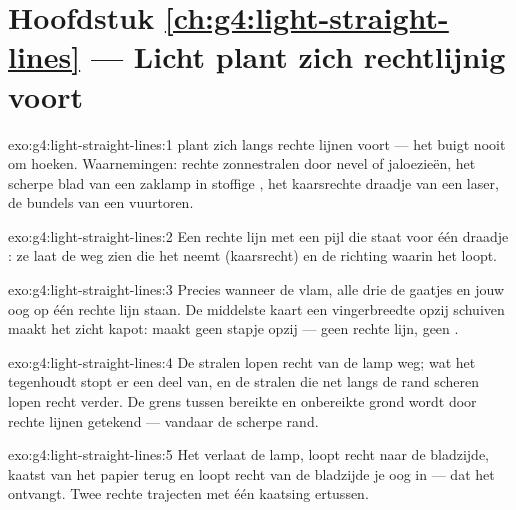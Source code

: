 \section*{Hoofdstuk \ref{ch:g4:light-straight-lines} --- Licht plant zich rechtlijnig voort}

\begin{solution}{exo:g4:light-straight-lines:1}
 plant zich langs rechte lijnen voort --- het buigt nooit om
hoeken. Waarnemingen: rechte zonnestralen door nevel of jaloezieën,
het scherpe blad van een zaklamp in stoffige , het kaarsrechte
draadje van een laser, de bundels van een vuurtoren.
\end{solution}

\begin{solution}{exo:g4:light-straight-lines:2}
Een rechte lijn met een pijl die staat voor één draadje : ze
laat de weg zien die het  neemt (kaarsrecht) en de richting waarin
het loopt.
\end{solution}

\begin{solution}{exo:g4:light-straight-lines:3}
Precies wanneer de vlam, alle drie de gaatjes en jouw oog op één
rechte lijn staan. De middelste kaart een vingerbreedte opzij schuiven
maakt het zicht kapot:  maakt geen stapje opzij --- geen rechte
lijn, geen .
\end{solution}

\begin{solution}{exo:g4:light-straight-lines:4}
De stralen lopen recht van de lamp weg; wat het  tegenhoudt stopt
er een deel van, en de stralen die net langs de rand scheren lopen
recht verder. De grens tussen bereikte en onbereikte grond wordt door
rechte lijnen getekend --- vandaar de scherpe rand.
\end{solution}

\begin{solution}{exo:g4:light-straight-lines:5}
Het  verlaat de lamp, loopt recht naar de bladzijde, kaatst van
het papier terug en loopt recht van de bladzijde je oog in --- dat het
ontvangt. Twee rechte trajecten met één kaatsing ertussen.
\end{solution}

